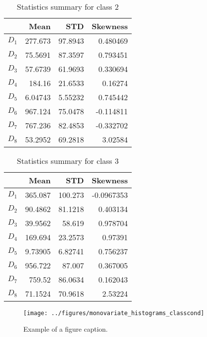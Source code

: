 \documentclass[conference]{IEEEtran}
\begin{document}
  \begin{table}[htp]
    \caption{Statistics summary for class 2}
      \centering
      \begin{tabular}{@{} crrr @{}}
        \toprule
         & Mean & STD & Skewness \\ 
        \midrule
        $D_1$ & 277.673  &  97.8943  &  0.480469 \\ 
        $D_2$ & 75.5691 &  87.3597  &  0.793451\\ 
        $D_3$ & 57.6739 &  61.9693  &  0.330694 \\ 
        $D_4$ & 184.16   &  21.6533 &   0.16274 \\ 
        $D_5$ & 6.04743  & 5.55232  & 0.745442 \\ 
        $D_6$ & 967.124 &   75.0478  & -0.114811 \\ 
        $D_7$ & 767.236  &  82.4853 &  -0.332702 \\ 
        $D_8$ & 53.2952  & 69.2818  &  3.02584 \\       
        \bottomrule
      \end{tabular}
    \label{statistics_table_class_2}
    \end{table}%

    \begin{table}[htp]
      \caption{Statistics summary for class 3}
        \centering
        \begin{tabular}{@{} crrr @{}}
          \toprule
           & Mean & STD & Skewness \\ 
          \midrule
          $D_1$ & 365.087  &  100.273  &  -0.0967353 \\ 
          $D_2$ & 90.4862  &  81.1218  &  0.403134 \\ 
          $D_3$ & 39.9562 &   58.619   &  0.978704 \\ 
          $D_4$ & 169.694  &   23.2573  &  0.97391 \\ 
          $D_5$ & 9.73905  &  6.82741  & 0.756237 \\ 
          $D_6$ & 956.722   &  87.007  &   0.367005 \\ 
          $D_7$ & 759.52   &   86.0634  &  0.162043 \\ 
          $D_8$ & 71.1524   & 70.9618  &  2.53224 \\       
          \bottomrule
        \end{tabular}
      \label{statistics_table_class_3}
      \end{table}%


\begin{figure}[htbp]
\centerline{\texttt{[image: ../figures/monovariate\_histograms\_classcond]}}
\caption{Example of a figure caption.}
\label{fig}
\end{figure}
\end{document}
